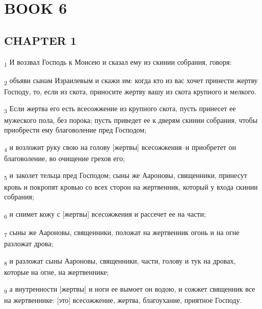 \section{BOOK 6}
\subsection{CHAPTER 1}
\begin{tcolorbox}
\textsubscript{1} И воззвал Господь к Моисею и сказал ему из скинии собрания, говоря:
\end{tcolorbox}
\begin{tcolorbox}
\textsubscript{2} объяви сынам Израилевым и скажи им: когда кто из вас хочет принести жертву Господу, то, если из скота, приносите жертву вашу из скота крупного и мелкого.
\end{tcolorbox}
\begin{tcolorbox}
\textsubscript{3} Если жертва его есть всесожжение из крупного скота, пусть принесет ее мужеского пола, без порока; пусть приведет ее к дверям скинии собрания, чтобы приобрести ему благоволение пред Господом;
\end{tcolorbox}
\begin{tcolorbox}
\textsubscript{4} и возложит руку свою на голову [жертвы] всесожжения--и приобретет он благоволение, во очищение грехов его;
\end{tcolorbox}
\begin{tcolorbox}
\textsubscript{5} и заколет тельца пред Господом; сыны же Аароновы, священники, принесут кровь и покропят кровью со всех сторон на жертвенник, который у входа скинии собрания;
\end{tcolorbox}
\begin{tcolorbox}
\textsubscript{6} и снимет кожу с [жертвы] всесожжения и рассечет ее на части;
\end{tcolorbox}
\begin{tcolorbox}
\textsubscript{7} сыны же Аароновы, священники, положат на жертвенник огонь и на огне разложат дрова;
\end{tcolorbox}
\begin{tcolorbox}
\textsubscript{8} и разложат сыны Аароновы, священники, части, голову и тук на дровах, которые на огне, на жертвеннике;
\end{tcolorbox}
\begin{tcolorbox}
\textsubscript{9} а внутренности [жертвы] и ноги ее вымоет он водою, и сожжет священник все на жертвеннике: [это] всесожжение, жертва, благоухание, приятное Господу.
\end{tcolorbox}
